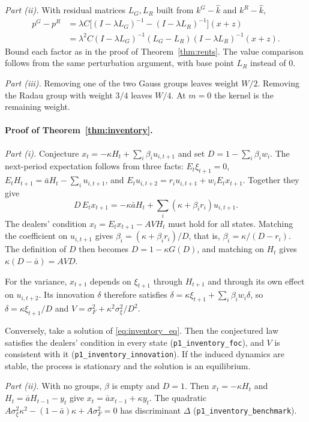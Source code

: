 \documentclass[12pt]{article}
\theoremstyle{definition}
\theoremstyle{remark}
\begin{document}
\emph{Part (ii).} With residual matrices $L_G,L_R$ built from $k^G-\hat k$ and $k^R-\hat k$,
\begin{align*}
p^G-p^R&=\lambda C\bigl[(I-\lambda L_G)^{-1}-(I-\lambda L_R)^{-1}\bigr](x+z)\\
&=\lambda^2C(I-\lambda L_G)^{-1}(L_G-L_R)(I-\lambda L_R)^{-1}(x+z).
\end{align*}
Bound each factor as in the proof of Theorem~\ref{thm:rents}. The value comparison follows from the same perturbation argument, with base point $L_R$ instead of $0$.

\emph{Part (iii).} Removing one of the two Gauss groups leaves weight $W/2$. Removing the Radau group with weight $3/4$ leaves $W/4$. At $m=0$ the kernel is the remaining weight.


\paragraph{Proof of Theorem~\ref{thm:inventory}.}
\emph{Part (i).} Conjecture $x_t=-\kappa H_t+\sum_i\beta_iu_{i,t+1}$ and set $D=1-\sum_i\beta_iw_i$. The next-period expectation follows from three facts: $E_t\xi_{t+1}=0$, $E_tH_{t+1}=\bar aH_t-\sum_iu_{i,t+1}$, and $E_tu_{i,t+2}=r_iu_{i,t+1}+w_iE_tx_{t+1}$. Together they give
\[
 D\,E_tx_{t+1}=-\kappa\bar aH_t+\sum_i(\kappa+\beta_ir_i)u_{i,t+1}.
\]
The dealers' condition $x_t=E_tx_{t+1}-AVH_t$ must hold for all states. Matching the coefficient on $u_{i,t+1}$ gives $\beta_i=(\kappa+\beta_ir_i)/D$, that is, $\beta_i=\kappa/(D-r_i)$. The definition of $D$ then becomes $D=1-\kappa G(D)$, and matching on $H_t$ gives $\kappa(D-\bar a)=AVD$.

For the variance, $x_{t+1}$ depends on $\xi_{t+1}$ through $H_{t+1}$ and through its own effect on $u_{i,t+2}$. Its innovation $\delta$ therefore satisfies $\delta=\kappa\xi_{t+1}+\sum_i\beta_iw_i\delta$, so $\delta=\kappa\xi_{t+1}/D$ and $V=\sigma_F^2+\kappa^2\sigma_\xi^2/D^2$.

Conversely, take a solution of \eqref{eq:inventory_eq}. Then the conjectured law satisfies the dealers' condition in every state (\nolinkurl{p1_inventory_foc}), and $V$ is consistent with it (\nolinkurl{p1_inventory_innovation}). If the induced dynamics are stable, the process is stationary and the solution is an equilibrium.

\emph{Part (ii).} With no groups, $\beta$ is empty and $D=1$. Then $x_t=-\kappa H_t$ and $H_t=\bar aH_{t-1}-y_t$ give $x_t=\bar ax_{t-1}+\kappa y_t$. The quadratic $A\sigma_\xi^2\kappa^2-(1-\bar a)\kappa+A\sigma_F^2=0$ has discriminant $\Delta$ (\nolinkurl{p1_inventory_benchmark}).
\end{document}
